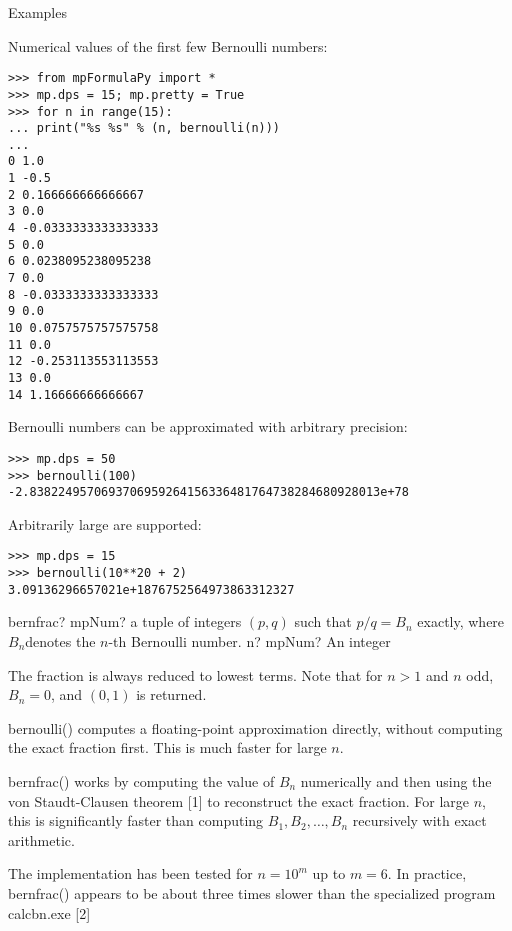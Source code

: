 Examples

Numerical values of the first few Bernoulli numbers:


\begin{lstlisting}
>>> from mpFormulaPy import *
>>> mp.dps = 15; mp.pretty = True
>>> for n in range(15):
... print("%s %s" % (n, bernoulli(n)))
...
0 1.0
1 -0.5
2 0.166666666666667
3 0.0
4 -0.0333333333333333
5 0.0
6 0.0238095238095238
7 0.0
8 -0.0333333333333333
9 0.0
10 0.0757575757575758
11 0.0
12 -0.253113553113553
13 0.0
14 1.16666666666667
\end{lstlisting}

Bernoulli numbers can be approximated with arbitrary precision:

\begin{lstlisting}
>>> mp.dps = 50
>>> bernoulli(100)
-2.8382249570693706959264156336481764738284680928013e+78
\end{lstlisting}

Arbitrarily large are supported:

\begin{lstlisting}
>>> mp.dps = 15
>>> bernoulli(10**20 + 2)
3.09136296657021e+1876752564973863312327
\end{lstlisting}


\vspace{0.6cm}
\begin{mpFunctionsExtract}
	\mpFunctionOne
	{bernfrac? mpNum? a tuple of integers $(p,q)$ such that $p/q=B_n$ exactly, where $B_n$denotes the $n$-th Bernoulli number.}
	{n? mpNum? An integer}	
\end{mpFunctionsExtract}

\vpara
The fraction is always reduced to lowest terms. Note that for $n>1$ and $n$ odd, $B_n=0$, and $(0,1)$ is returned.

\vpara
bernoulli() computes a floating-point approximation directly, without computing the exact fraction first. This is much faster for large $n$.

\vpara
bernfrac() works by computing the value of $B_n$ numerically and then using the von Staudt-Clausen theorem [1] to reconstruct the exact fraction. For large $n$, this is significantly faster than computing $B_1,B_2,\ldots,B_n$ recursively with exact arithmetic.

\vpara
The implementation has been tested for $n=10^m$ up to $m=6$. In practice, bernfrac() appears to be about three times slower than the specialized program calcbn.exe [2]

